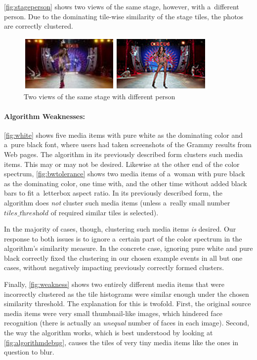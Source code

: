 \autoref{fig:stageperson} shows two views of the same stage,
however, with a~different person.
Due to the dominating tile-wise similarity of the stage tiles,
the photos are correctly clustered.

\begin{figure}[h!]
  \centering
  \includegraphics[width=0.6\linewidth]{./stage.png}
  \caption{Two views of the same stage with different person}
  \label{fig:stageperson}
\end{figure}

\paragraph{Algorithm Weaknesses:}

\autoref{fig:white} shows five media items with pure white
as the dominating color and a~pure black font,
where users had taken screenshots of the Grammy results from Web pages.
The algorithm in its previously described form clusters such media items.
This may or may not be desired.
Likewise at the other end of the color spectrum,
\autoref{fig:bwtolerance} shows two media items of a~woman
with pure black as the dominating color,
one time with, and the other time without added black bars
to fit a~letterbox aspect ratio.
In its previously described form, the algorithm
does \emph{not} cluster such media items
(unless a~really small number $\textit{tiles\_threshold}$ 
of required similar tiles is selected).

In the majority of cases, though, clustering such media items \emph{is} desired.
Our response to both issues is to ignore a~certain part
of the color spectrum in the algorithm's similarity measure.
In the concrete case, ignoring pure white and pure black correctly fixed
the clustering in our chosen example events in all but one cases,
without negatively impacting previously correctly formed clusters.

Finally, \autoref{fig:weakness} shows two entirely different media items
that were incorrectly clustered as the tile histograms
were similar enough under the chosen similarity threshold.
The explanation for this is twofold.
First, the original source media items were very small thumbnail-like images,
which hindered face recognition
(there is actually an \emph{unequal} number of faces in each image).
Second, the way the algorithm works,
which is best understood by looking at \autoref{fig:algorithmdebug},
causes the tiles of very tiny media items like the ones in question to blur.

